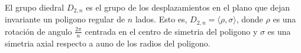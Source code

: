 \question 
El grupo diedral $D_{2,n}$ es el grupo de los desplazamientos en el plano que dejan invariante un poligono regular de $n$ lados. Esto es, $D_{2,n}=\langle \rho, \sigma \rangle$, donde $\rho$ es una rotación de angulo $\frac{2\pi}{n}$ centrada en el centro de simetria del poligono y $\sigma$ es una simetria axial respecto a auno de los radios del poligono.
